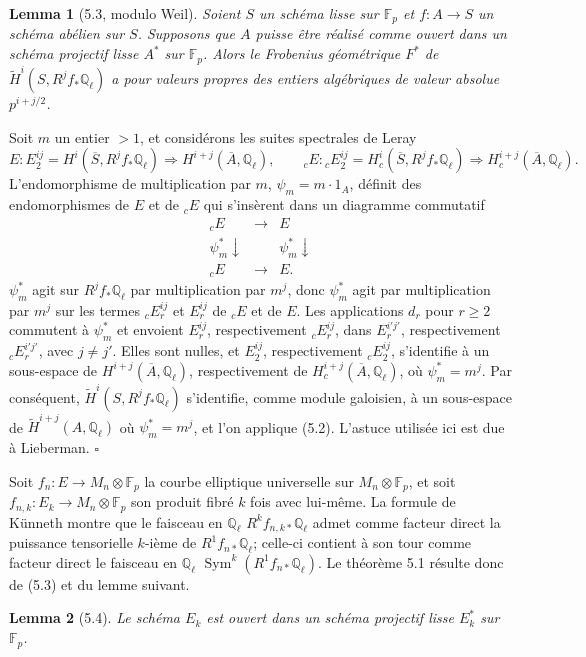 \documentclass[10pt]{article}
\newcommand{\F}{\mathbb F}
\newcommand{\Q}{\mathbb Q}
\newcommand{\Sym}{\operatorname{Sym}}
\newcommand{\QED}{\hfill$\square$}
\newtheorem*{lemma}{Lemma}
\begin{document}
\begin{lemma}[5.3, modulo Weil]
Soient $S$ un schéma lisse sur $\F_p$ et $f:A\to S$ un schéma abélien sur $S$. Supposons que $A$ puisse être réalisé comme ouvert dans un schéma projectif lisse $A^*$ sur $\F_p$. Alors le Frobenius géométrique $F^*$ de $\widetilde H^i(S,R^jf_*\Q_\ell)$ a pour valeurs propres des entiers algébriques de valeur absolue $p^{i+j/2}$.
\end{lemma}

Soit $m$ un entier $>1$, et considérons les suites spectrales de Leray
\[
E:
E_2^{ij}=H^i(\overline S,R^jf_*\Q_\ell)\Longrightarrow H^{i+j}(\overline A,\Q_\ell),
\qquad
{}_cE:
{}_cE_2^{ij}=H_c^i(\overline S,R^jf_*\Q_\ell)\Longrightarrow H_c^{i+j}(\overline A,\Q_\ell).
\]
L'endomorphisme de multiplication par $m$, $\psi_m=m\cdot1_A$, définit des endomorphismes de $E$ et de ${}_cE$ qui s'insèrent dans un diagramme commutatif
\[
\begin{array}{ccc}
{}_cE&\longrightarrow&E\\
\psi_m^*\downarrow&&\psi_m^*\downarrow\\
{}_cE&\longrightarrow&E.
\end{array}
\]
$\psi_m^*$ agit sur $R^jf_*\Q_\ell$ par multiplication par $m^j$, donc $\psi_m^*$ agit par multiplication par $m^j$ sur les termes ${}_cE_r^{ij}$ et $E_r^{ij}$ de ${}_cE$ et de $E$. Les applications $d_r$ pour $r\ge2$ commutent à $\psi_m^*$ et envoient $E_r^{ij}$, respectivement ${}_cE_r^{ij}$, dans $E_r^{i'j'}$, respectivement ${}_cE_r^{i'j'}$, avec $j\ne j'$. Elles sont nulles, et $E_2^{ij}$, respectivement ${}_cE_2^{ij}$, s'identifie à un sous-espace de $H^{i+j}(\overline A,\Q_\ell)$, respectivement de $H_c^{i+j}(\overline A,\Q_\ell)$, où $\psi_m^*=m^j$. Par conséquent, $\widetilde H^i(S,R^jf_*\Q_\ell)$ s'identifie, comme module galoisien, à un sous-espace de $\widetilde H^{i+j}(A,\Q_\ell)$ où $\psi_m^*=m^j$, et l'on applique (5.2). L'astuce utilisée ici est due à Lieberman. \QED

Soit $f_n:E\to M_n\otimes\F_p$ la courbe elliptique universelle sur $M_n\otimes\F_p$, et soit $f_{n,k}:E_k\to M_n\otimes\F_p$ son produit fibré $k$ fois avec lui-même. La formule de Künneth montre que le faisceau en $\Q_\ell$ $R^kf_{n,k*}\Q_\ell$ admet comme facteur direct la puissance tensorielle $k$-ième de $R^1f_{n*}\Q_\ell$; celle-ci contient à son tour comme facteur direct le faisceau en $\Q_\ell$ $\Sym^k(R^1f_{n*}\Q_\ell)$. Le théorème 5.1 résulte donc de (5.3) et du lemme suivant.

\begin{lemma}[5.4]
Le schéma $E_k$ est ouvert dans un schéma projectif lisse $E_k^*$ sur $\F_p$.
\end{lemma}
\end{document}
